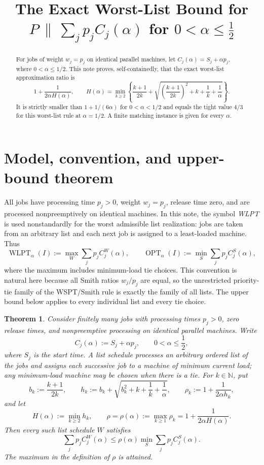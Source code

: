 \documentclass[11pt]{article}
\title{The Exact Worst-List Bound for
\texorpdfstring{$P\,\|\,\sum_j p_j C_j(\alpha)$}
{P || sum p_j Cj(alpha)}
for \texorpdfstring{$0<\alpha\leq\tfrac12$}{0 < alpha <= 1/2}}
\author{}
\date{}
\newtheorem{theorem}{Theorem}[section]
\theoremstyle{remark}
\newcommand{\OPT}{\operatorname{OPT}}
\newcommand{\WLPT}{\operatorname{WLPT}}
\begin{document}
\maketitle

\begin{abstract}
For jobs of weight $w_j=p_j$ on identical parallel machines, let
$C_j(\alpha)=S_j+\alpha p_j$, where $0<\alpha\leq1/2$.  This note
proves, self-containedly, that the exact worst-list approximation ratio is
\[
 1+\frac{1}{2\alpha H(\alpha)},\qquad
 H(\alpha)=\min_{k\geq2}\left\{
 \frac{k+1}{2k}+
 \sqrt{\left(\frac{k+1}{2k}\right)^2+
 k+\frac1k+\frac1\alpha}\right\}.
\]
It is strictly smaller than $1+1/(6\alpha)$ for
$0<\alpha<1/2$ and equals the tight value $4/3$ for this worst-list
rule at $\alpha=1/2$.  A finite matching instance is given for every
$\alpha$.
\end{abstract}

\section{Model, convention, and upper-bound theorem}

All jobs have processing time $p_j>0$, weight $w_j=p_j$, release time
zero, and are processed nonpreemptively on identical machines.  In this
note, the symbol \emph{WLPT} is used nonstandardly for the worst
admissible list realization: jobs are taken from an arbitrary list and
each next job is assigned to a least-loaded machine.  Thus
\[
 \WLPT_\alpha(I):=\max_W\sum_jp_jC_j^W(\alpha),
 \qquad
 \OPT_\alpha(I):=\min_S\sum_jp_jC_j^S(\alpha),
\]
where the maximum includes minimum-load tie choices.  This convention is
natural here because all Smith ratios $w_j/p_j$ are equal, so the
unrestricted priority-tie family of the WSPT/Smith rule is exactly the
family of all lists.  The upper bound below applies to every individual
list and every tie choice.

\begin{theorem}\label{thm:exact-wlpt-alpha}
Consider finitely many jobs with processing times \(p_j>0\), zero release
times, and nonpreemptive processing on identical parallel machines.  Write
\[
 C_j(\alpha):=S_j+\alpha p_j,\qquad 0<\alpha\leq\frac12,
\]
where \(S_j\) is the start time.  A \emph{list schedule} processes an
arbitrary ordered list of the jobs and assigns each successive job to a
machine of minimum current load; any minimum-load machine may be chosen
when there is a tie.  For $k\in\mathbb N$, put
\[
 b_k:=\frac{k+1}{2k},\qquad
 h_k:=b_k+\sqrt{b_k^2+k+\frac1k+\frac1\alpha},
 \qquad
 \rho_k:=1+\frac{1}{2\alpha h_k},
\]
and let
\[
 H(\alpha):=\min_{k\geq2}h_k,
 \qquad
 \rho=\rho(\alpha):=\max_{k\geq1}\rho_k
 =1+\frac{1}{2\alpha H(\alpha)}.
\]
Then every such list schedule $W$ satisfies
\[
 \sum_jp_jC_j^W(\alpha)
 \leq \rho(\alpha)\min_S\sum_jp_jC_j^S(\alpha).
\]
The maximum in the definition of $\rho$ is attained.
\end{theorem}
\end{document}
